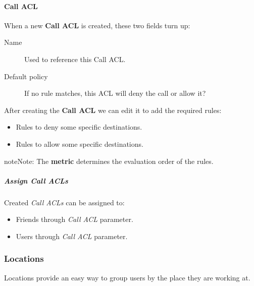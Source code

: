 \documentclass[letterpaper,10pt,english]{sphinxmanual}
\begin{document}
\paragraph{Call ACL}
\label{administration_portal/client/vpbx/user_configuration/call_acls:call-acl}
When a new \textbf{Call ACL} is created, these two fields turn up:
\begin{description}
\item[{Name}] \leavevmode{}\label{administration_portal/client/vpbx/user_configuration/call_acls:term-name}
Used to reference this Call ACL.

\item[{Default policy}] \leavevmode{}\label{administration_portal/client/vpbx/user_configuration/call_acls:term-default-policy}
If no rule matches, this ACL will deny the call or allow it?

\end{description}

After creating the \textbf{Call ACL} we can edit it to add the required rules:
\begin{itemize}
\item {} 
Rules to deny some specific destinations.

\item {} 
Rules to allow some specific destinations.

\end{itemize}

\begin{notice}{note}{Note:}
The \textbf{metric} determines the evaluation order of the rules.
\end{notice}


\subparagraph{Assign Call ACLs}
\label{administration_portal/client/vpbx/user_configuration/call_acls:assign-call-acls}
Created \emph{Call ACLs} can be assigned to:
\begin{itemize}
\item {} 
Friends through \emph{Call ACL} parameter.

\item {} 
Users through \emph{Call ACL} parameter.

\end{itemize}


\subsubsection{Locations}
\label{administration_portal/client/vpbx/user_configuration/locations::doc}\label{administration_portal/client/vpbx/user_configuration/locations:locations}
Locations provide an easy way to group users by the place they are working at.
\end{document}
